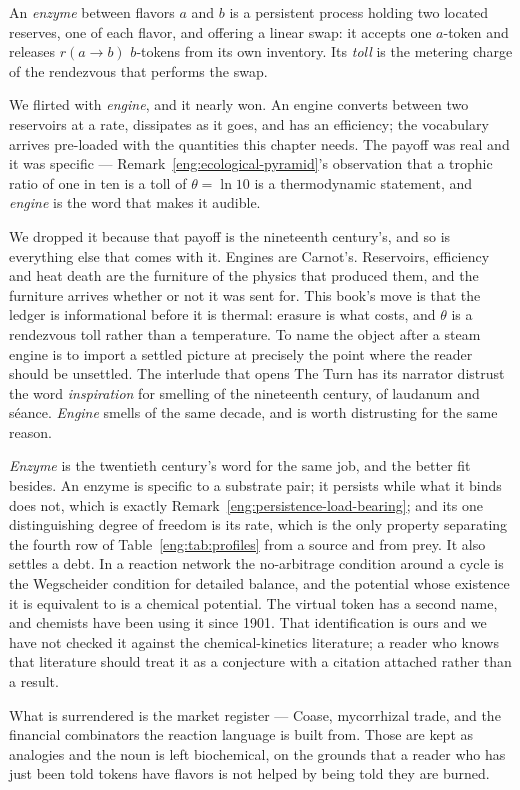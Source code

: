 \begin{definition}[Enzyme]\label{eng:def:engine}
An \emph{enzyme} between flavors $a$ and $b$ is a persistent process
holding two located reserves, one of each flavor, and offering a linear
swap: it accepts one $a$-token and releases $r(a{\to}b)$ $b$-tokens from
its own inventory. Its \emph{toll} is the metering charge of the rendezvous
that performs the swap.
\end{definition}

\begin{remark}
\label{eng:rem:nomenclature}
We flirted with \emph{engine}, and it nearly won. An engine converts between two
reservoirs at a rate, dissipates as it goes, and has an efficiency; the vocabulary
arrives pre-loaded with the quantities this chapter needs. The payoff was real and it
was specific --- Remark~\ref{eng:ecological-pyramid}'s observation that a trophic ratio
of one in ten is a toll of $\theta = \ln 10$ is a thermodynamic statement, and
\emph{engine} is the word that makes it audible.

We dropped it because that payoff is the nineteenth century's, and so is everything
else that comes with it. Engines are Carnot's. Reservoirs, efficiency and heat death are
the furniture of the physics that produced them, and the furniture arrives whether or
not it was sent for. This book's move is that the ledger is informational before it is
thermal: erasure is what costs, and $\theta$ is a rendezvous toll rather than a
temperature. To name the object after a steam engine is to import a settled picture at
precisely the point where the reader should be unsettled. The interlude that opens
The Turn has its narrator distrust the word \emph{inspiration} for smelling of the
nineteenth century, of laudanum and s\'eance. \emph{Engine} smells of the same decade,
and is worth distrusting for the same reason.

\emph{Enzyme} is the twentieth century's word for the same job, and the better fit
besides. An enzyme is specific to a substrate pair; it persists while what it binds does
not, which is exactly Remark~\ref{eng:persistence-load-bearing}; and its one
distinguishing degree of freedom is its rate, which is the only property separating the
fourth row of Table~\ref{eng:tab:profiles} from a source and from prey. It also settles
a debt. In a reaction network the no-arbitrage condition around a cycle is the
Wegscheider condition for detailed balance, and the potential whose existence it is
equivalent to is a chemical potential. The virtual token has a second name, and chemists
have been using it since 1901. That identification is ours and we have not checked it
against the chemical-kinetics literature; a reader who knows that literature should
treat it as a conjecture with a citation attached rather than a result.

What is surrendered is the market register --- Coase, mycorrhizal trade, and the
financial combinators the reaction language is built from. Those are kept as analogies
and the noun is left biochemical, on the grounds that a reader who has just been told
tokens have flavors is not helped by being told they are burned.
\end{remark}

